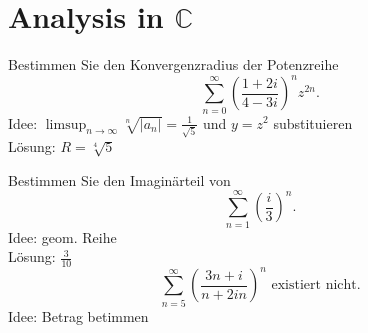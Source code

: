 \section{Analysis in $\mathbb{C}$}
Bestimmen Sie den Konvergenzradius der Potenzreihe
\begin{displaymath}
  \sum_{n = 0}^{\infty} \left(\frac{1+2i}{4-3i}\right)^n z^{2n}.
\end{displaymath}
Idee: $\limsup_{n \to \infty} \sqrt[n]{|a_n|} = \frac{1}{\sqrt{5}}$ und $y = z^2$ substituieren\\
Lösung: $R = \sqrt[4]{5}$

Bestimmen Sie den Imaginärteil von
\begin{displaymath}
  \sum_{n = 1}^{\infty} \left(\frac{i}{3}\right)^n.
\end{displaymath}
Idee: geom. Reihe\\
Lösung: $\frac{3}{10}$
\begin{displaymath}
\sum_{n = 5}^{\infty} \left(\frac{3n+i}{n + 2in}\right)^n \text{ existiert nicht.}
\end{displaymath}
Idee: Betrag betimmen